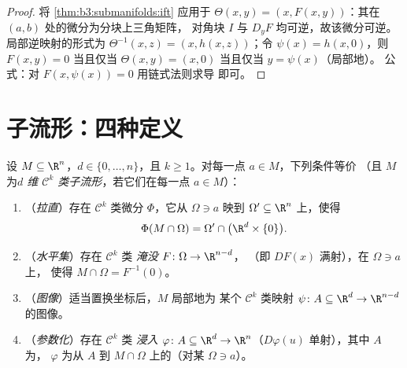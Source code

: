 \begin{proof}
将 \cref{thm:b3:submanifolds:ift} 应用于 $\Theta(x, y) = (x,
F(x,y))$：其在 $(a,b)$ 处的微分为分块上三角矩阵，
对角块 $I$ 与 $D_yF$ 均可逆，故该微分可逆。
局部逆映射的形式为 $\Theta^{-1}(x, z) = (x, h(x,
z))$；令 $\psi(x) = h(x, 0)$，则 $F(x, y) = 0$ 当且仅当
$\Theta(x,y) = (x, 0)$ 当且仅当 $y = \psi(x)$（局部地）。
公式：对 $F(x, \psi(x)) = 0$ 用链式法则求导
即可。
\end{proof}

\section{子流形：四种定义}

\begin{theorem}[等价刻画]
\label{thm:b3:submanifolds:characterizations}
设 $M \subseteq \R^n$，$d \in \{0, \dots, n\}$，且 $k \geq
1$。对每一点 $a \in M$，下列条件等价
（且 $M$ 为\emph{$d$ 维
$\mathcal C^k$ 类子流形}，若它们在每一点 $a
\in M$）：
\begin{enumerate}
  \item （\emph{拉直}）存在 $\mathcal C^k$ 类微分
        $\Phi$，它从 $\Omega \ni a$
        映到 $\Omega' \subseteq \R^n$ 上，使得
        \[
        \Phi(M\cap\Omega) = \Omega' \cap
        \bigl(\R^d\times\{0\}\bigr).
        \]
  \item （\emph{水平集}）存在 $\mathcal C^k$ 类
        \emph{淹没} $F \colon \Omega \to \R^{n-d}$，
        （即 $DF(x)$ 满射），在 $\Omega \ni a$ 上，
        使得 $M\cap\Omega = F^{-1}(0)$。
  \item （\emph{图像}）适当置换坐标后，$M$ 局部地为
        某个 $\mathcal C^k$ 类映射 $\psi
        \colon A \subseteq \R^d \to \R^{n-d}$ 的图像。
  \item （\emph{参数化}）存在 $\mathcal C^k$ 类
        \emph{浸入} $\varphi \colon A \subseteq \R^d \to
        \R^n$（$D\varphi(u)$ 单射），其中 $A$ 为，
        $\varphi$ 为从 $A$ 到 $M \cap
        \Omega$ 上的（对某 $\Omega \ni a$）。
\end{enumerate}
\end{theorem}

